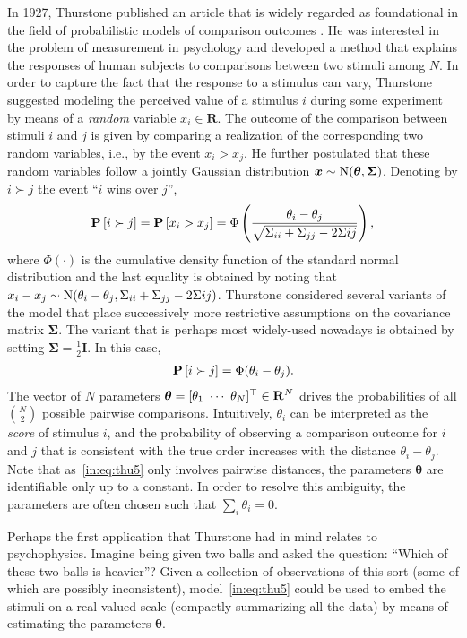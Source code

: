 In 1927, Thurstone published an article that is widely regarded as foundational in the field of probabilistic models of comparison outcomes \citep{thurstone1927law}.
He was interested in the problem of measurement in psychology and developed a method that explains the responses of human subjects to comparisons between two stimuli among $N$.
In order to capture the fact that the response to a stimulus can vary, Thurstone suggested modeling the perceived value of a stimulus $i$ during some experiment by means of a \emph{random} variable $x_i \in \mathbf{R}$.
The outcome of the comparison between stimuli $i$ and $j$ is given by comparing a realization of the corresponding two random variables, i.e., by the event $x_i > x_j$.
He further postulated that these random variables follow a jointly Gaussian distribution $\bm{x} \sim \mathrm{N}( \bm{\theta}, \bm{\Sigma} )$.
Denoting by $i \succ j$ the event ``$i$ wins over $j$'',
\begin{align*}
\mathbf{P}\left[ i \succ j \right] = \mathbf{P}\left[ x_i > x_j \right] = \Phi \left( \frac{\theta_i - \theta_j}{\sqrt{\Sigma_{ii} + \Sigma_{jj} - 2\Sigma{ij}}} \right),
\end{align*}
where $\Phi(\cdot)$ is the cumulative density function of the standard normal distribution and the last equality is obtained by noting that $x_i - x_j \sim \mathrm{N}( \theta_i - \theta_j, \Sigma_{ii} + \Sigma_{jj} - 2\Sigma{ij} )$.
Thurstone considered several variants of the model that place successively more restrictive assumptions on the covariance matrix $\bm{\Sigma}$.
The variant that is perhaps most widely-used nowadays is obtained by setting $\bm{\Sigma} = \tfrac{1}{2} \bm{I}$.
In this case,
\begin{align}
\label{in:eq:thu5}
\mathbf{P}\left[ i \succ j \right] = \Phi(\theta_i - \theta_j).
\end{align}
The vector of $N$ parameters $\bm{\theta} = [\theta_1 \ \cdots \ \theta_N]^\Tr \in \mathbf{R}^N$ drives the probabilities of all $\binom{N}{2}$ possible pairwise comparisons.
Intuitively, $\theta_i$ can be interpreted as the \emph{score} of stimulus $i$, and the probability of observing a comparison outcome for $i$ and $j$ that is consistent with the true order increases with the distance $\theta_i - \theta_j$.
Note that as~\eqref{in:eq:thu5} only involves pairwise distances, the parameters $\bm{\theta}$ are identifiable only up to a constant.
In order to resolve this ambiguity, the parameters are often chosen such that $\sum_i \theta_i = 0$.

Perhaps the first application that Thurstone had in mind relates to psychophysics.
Imagine being given two balls and asked the question: ``Which of these two balls is heavier''?
Given a collection of observations of this sort (some of which are possibly inconsistent), model~\eqref{in:eq:thu5} could be used to embed the stimuli on a real-valued scale (compactly summarizing all the data) by means of estimating the parameters $\bm{\theta}$.

